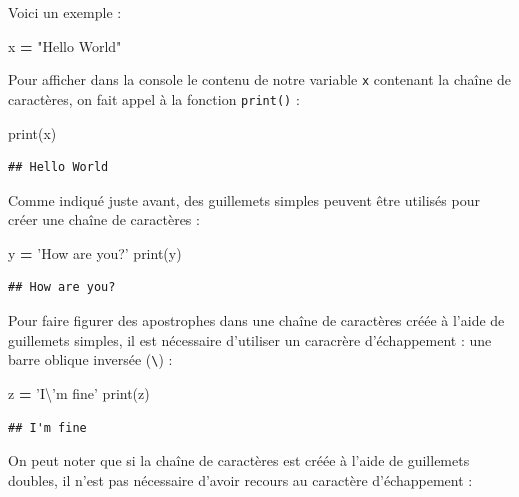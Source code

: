 \documentclass[12pt,]{book}
\newenvironment{Shaded}{\begin{snugshade}}{\end{snugshade}}
\newcommand{\CharTok}[1]{\textcolor[rgb]{0.31,0.60,0.02}{#1}}
\newcommand{\StringTok}[1]{\textcolor[rgb]{0.31,0.60,0.02}{#1}}
\newcommand{\OperatorTok}[1]{\textcolor[rgb]{0.81,0.36,0.00}{\textbf{#1}}}
\newcommand{\BuiltInTok}[1]{#1}
\newcommand{\NormalTok}[1]{#1}
\numberwithin{equation}{section}
\numberwithin{countremarque}{section}
\begin{document}
Voici un exemple :

\begin{Shaded}
\begin{Highlighting}[]
\NormalTok{x }\OperatorTok{=} \StringTok{"Hello World"}
\end{Highlighting}
\end{Shaded}

Pour afficher dans la console le contenu de notre variable \texttt{x}
contenant la chaîne de caractères, on fait appel à la fonction
\texttt{print()} :

\begin{Shaded}
\begin{Highlighting}[]
\BuiltInTok{print}\NormalTok{(x)}
\end{Highlighting}
\end{Shaded}

\begin{lstlisting}
## Hello World
\end{lstlisting}

Comme indiqué juste avant, des guillemets simples peuvent être utilisés
pour créer une chaîne de caractères :

\begin{Shaded}
\begin{Highlighting}[]
\NormalTok{y }\OperatorTok{=} \StringTok{'How are you?'}
\BuiltInTok{print}\NormalTok{(y)}
\end{Highlighting}
\end{Shaded}

\begin{lstlisting}
## How are you?
\end{lstlisting}

Pour faire figurer des apostrophes dans une chaîne de caractères créée à
l'aide de guillemets simples, il est nécessaire d'utiliser un caracrère
d'échappement : une barre oblique inversée (\texttt{\textbackslash{}}) :

\begin{Shaded}
\begin{Highlighting}[]
\NormalTok{z }\OperatorTok{=} \StringTok{'I}\CharTok{\textbackslash{}'}\StringTok{m fine'}
\BuiltInTok{print}\NormalTok{(z)}
\end{Highlighting}
\end{Shaded}

\begin{lstlisting}
## I'm fine
\end{lstlisting}

On peut noter que si la chaîne de caractères est créée à l'aide de
guillemets doubles, il n'est pas nécessaire d'avoir recours au caractère
d'échappement :
\end{document}
